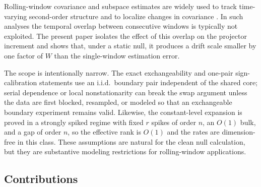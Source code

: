 \documentclass[11pt]{article}
\theoremstyle{tightplain}
\theoremstyle{tightdef}
\begin{document}
Rolling-window covariance and subspace estimates are widely used to track
time-varying second-order structure and to localize changes in covariance
\cite{AueEtAl2009,WangYuRinaldo2021}. In such analyses the temporal overlap
between consecutive windows is typically not exploited. The present paper
isolates the effect of this overlap on the projector increment and shows that,
under a static null, it produces a drift scale smaller by one factor of $W$
than the single-window estimation error.

The scope is intentionally narrow. The exact exchangeability and one-pair
sign-calibration statements use an i.i.d.\ boundary pair independent of the
shared core; serial dependence or local nonstationarity can break the swap
argument unless the data are first blocked, resampled, or modeled so that an
exchangeable boundary experiment remains valid. Likewise, the constant-level
expansion is proved in a strongly spiked regime with fixed $r$ spikes of order
$n$, an $O(1)$ bulk, and a gap of order $n$, so the effective rank is $O(1)$
and the rates are dimension-free in this class. These assumptions are natural
for the clean null calculation, but they are substantive modeling restrictions
for rolling-window applications.

\subsection{Contributions}
\end{document}
